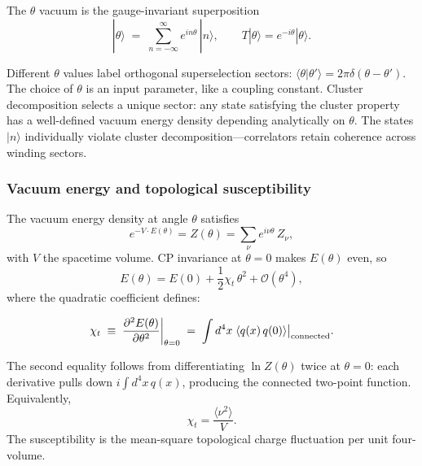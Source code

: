 \begin{definition}\label{def:theta-vacuum}
The $\theta$ vacuum is the gauge-invariant superposition
\begin{equation}\label{eq:theta-vacuum}
  |\theta\rangle \;=\; \sum_{n=-\infty}^{\infty} e^{in\theta}\,|n\rangle,
  \qquad T|\theta\rangle = e^{-i\theta}|\theta\rangle.
\end{equation}
\end{definition}

\noindent Different $\theta$ values label orthogonal superselection sectors: $\langle\theta|\theta'\rangle = 2\pi\delta(\theta-\theta')$.  The choice of $\theta$ is an input parameter, like a coupling constant.  Cluster decomposition selects a unique sector: any state satisfying the cluster property has a well-defined vacuum energy density depending analytically on $\theta$.  The states $|n\rangle$ individually violate cluster decomposition---correlators retain coherence across winding sectors.

\subsubsection{Vacuum energy and topological susceptibility}

The vacuum energy density at angle $\theta$ satisfies
\begin{equation}\label{eq:vacuum-energy-theta}
  e^{-V\cdot E(\theta)} = Z(\theta) = \sum_\nu e^{i\nu\theta}\,Z_\nu,
\end{equation}
with $V$ the spacetime volume. CP invariance at $\theta=0$ makes $E(\theta)$ even, so
\begin{equation}\label{eq:E-theta-expansion}
  E(\theta) = E(0) + \frac{1}{2}\chi_t\,\theta^2 + \mathcal{O}(\theta^4),
\end{equation}
where the quadratic coefficient defines:

\begin{definition}\label{def:chi-t}
\begin{equation}\label{eq:chi-t-definition}
  \chi_t \;\equiv\; \frac{\partial^2 E(\theta)}{\partial\theta^2}\bigg|_{\theta=0}
  \;=\; \int d^4x\;\langle q(x)\,q(0)\rangle\big|_{\mathrm{connected}}.
\end{equation}
\end{definition}

\noindent The second equality follows from differentiating $\ln Z(\theta)$ twice at $\theta=0$: each derivative pulls down $i\int d^4x\,q(x)$, producing the connected two-point function.  Equivalently,
\begin{equation}\label{eq:chi-t-variance}
  \chi_t = \frac{\langle\nu^2\rangle}{V}.
\end{equation}
The susceptibility is the mean-square topological charge fluctuation per unit four-volume.

